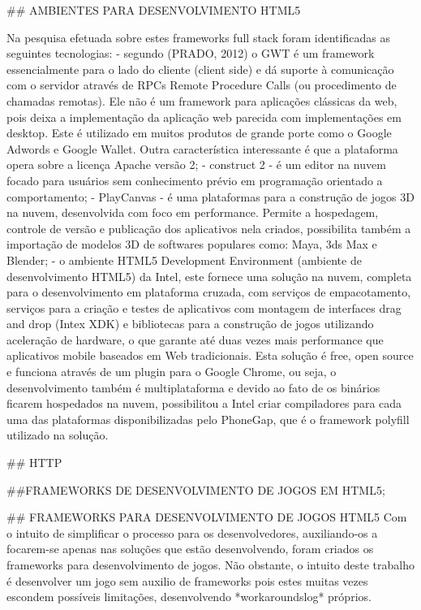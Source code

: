 \documentclass[11pt,a4paper]{article}
\begin{document}
## AMBIENTES PARA DESENVOLVIMENTO HTML5

Na pesquisa efetuada sobre estes frameworks full stack foram identificadas as seguintes tecnologias:
    - segundo (PRADO, 2012) o GWT é um framework essencialmente para o lado do cliente (client side) e dá suporte à comunicação com o servidor através de RPCs Remote Procedure Calls (ou procedimento de chamadas remotas). Ele não é um framework para aplicações clássicas da web, pois deixa a implementação da aplicação web parecida com implementações em desktop. Este é utilizado em muitos produtos de grande porte como o Google Adwords e Google Wallet. Outra característica interessante é que a plataforma opera sobre a licença Apache versão 2;
    - construct 2 -  é um editor na nuvem focado para usuários sem conhecimento prévio em programação orientado a comportamento;
    - PlayCanvas - é uma plataformas para a construção de jogos 3D na nuvem, desenvolvida com foco em performance. Permite a hospedagem, controle de versão e publicação dos aplicativos nela criados, possibilita também a importação de modelos 3D de softwares populares como: Maya, 3ds Max e Blender;
    - o ambiente HTML5 Development Environment (ambiente de desenvolvimento HTML5) da Intel, este fornece uma solução na nuvem, completa para o desenvolvimento em plataforma cruzada, com serviços de empacotamento, serviços para a criação e testes de aplicativos com montagem de interfaces drag and drop (Intex XDK) e bibliotecas para a construção de jogos utilizando aceleração de hardware, o que garante até duas vezes mais performance que aplicativos mobile baseados em Web tradicionais. Esta solução é free, open source e funciona através de um plugin para o Google Chrome, ou seja, o desenvolvimento também é multiplataforma e devido ao fato de os binários ficarem hospedados na nuvem, possibilitou a Intel criar compiladores para cada uma das plataformas disponibilizadas pelo PhoneGap, que é o framework polyfill utilizado na solução.

## HTTP

##FRAMEWORKS DE DESENVOLVIMENTO DE JOGOS EM HTML5;


## FRAMEWORKS PARA DESENVOLVIMENTO DE JOGOS HTML5
Com o intuito de simplificar o processo para os desenvolvedores, auxiliando-os a focarem-se apenas nas soluções que estão desenvolvendo, foram criados os frameworks para desenvolvimento de jogos. Não obstante, o intuito deste trabalho é desenvolver um jogo sem auxilio de frameworks pois estes muitas vezes escondem possíveis limitações, desenvolvendo *workaroundslog* próprios.
\end{document}
